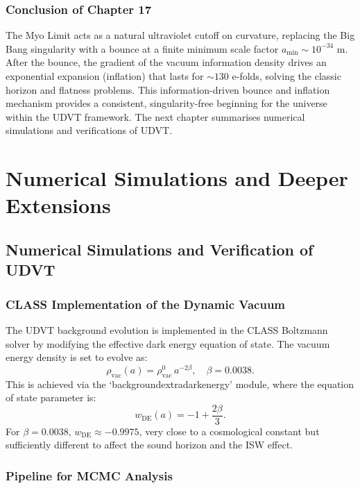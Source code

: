 \documentclass[12pt,a4paper]{book}
\theoremstyle{definition}
\theoremstyle{remark}
\begin{document}
\section{Conclusion of Chapter 17}

The Myo Limit acts as a natural ultraviolet cutoff on curvature, replacing the Big Bang singularity with a bounce at a finite minimum scale factor $a_{\mathrm{min}} \sim 10^{-34}$ m. After the bounce, the gradient of the vacuum information density drives an exponential expansion (inflation) that lasts for $\sim 130$ e-folds, solving the classic horizon and flatness problems. This information-driven bounce and inflation mechanism provides a consistent, singularity-free beginning for the universe within the UDVT framework. The next chapter summarises numerical simulations and verifications of UDVT.

\part{Numerical Simulations and Deeper Extensions}

\chapter{Numerical Simulations and Verification of UDVT}
\label{ch:numerical}

\section{CLASS Implementation of the Dynamic Vacuum}

The UDVT background evolution is implemented in the CLASS Boltzmann solver by modifying the effective dark energy equation of state. The vacuum energy density is set to evolve as:
\begin{equation}
    \rho_{\mathrm{vac}}(a) = \rho_{\mathrm{vac}}^0 \, a^{-2\beta}, \quad \beta = 0.0038.
\end{equation}
This is achieved via the `backgroundextradarkenergy' module, where the equation of state parameter is:
\begin{equation}
    w_{\mathrm{DE}}(a) = -1 + \frac{2\beta}{3}.
\end{equation}
For $\beta = 0.0038$, $w_{\mathrm{DE}} \approx -0.9975$, very close to a cosmological constant but sufficiently different to affect the sound horizon and the ISW effect.

\section{Pipeline for MCMC Analysis}
\end{document}
